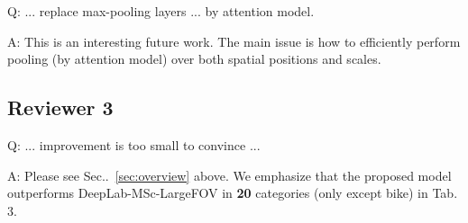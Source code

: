 \documentclass[10pt,twocolumn,letterpaper]{article}
\makeatletter
\def\@onedot{\ifx\@let@token.\else.\null\fi\xspace}
\DeclareRobustCommand\onedot{\futurelet\@let@token\@onedot}
\newcommand{\secref}[1]{Sec\onedot~\ref{#1}}
\makeatother
\begin{document}
Q: ... replace max-pooling layers ... by attention model.

A: This is an interesting future work. The main issue is how to efficiently perform pooling (by attention model) over both spatial positions and scales. %

\vspace{-0.17cm}
\subsection{Reviewer 3}
\vspace{-0.17cm}
Q: ... improvement is too small to convince ...

A: Please see \secref{sec:overview} above. We emphasize that the proposed model outperforms DeepLab-MSc-LargeFOV in {\bf 20} categories (only except bike) in Tab. 3.

\vspace{-0.17cm}
{\scriptsize


}
\vspace{-0.17cm}
\end{document}
